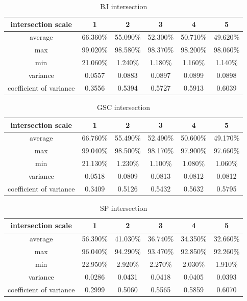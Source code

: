 \documentclass[runningheads,a4paper]{llncs}
\begin{document}
\begin{table}
\centering
\begin{tabular}{|c|c|c|c|c|c|}
\hline
 intersection scale & 1 & 2 & 3 & 4& 5 \\
\hline
average& 66.360\% & 55.090\% & 52.300\% & 50.710\%& 49.620\% \\
\hline
max& 99.020\% & 98.580\% & 98.370\% & 98.200\%& 98.060\% \\
\hline
min& 21.060\% & 1.240\% & 1.180\% & 1.160\%& 1.140\%\\
\hline
variance& 0.0557 & 0.0883 & 0.0897 & 0.0899& 0.0898 \\
\hline
coefficient of variance& 0.3556 & 0.5394 & 0.5727 & 0.5913& 0.6039\\
\hline
\end{tabular}
\caption{BJ intersection}
\label{ta:bj intersection}
\end{table} 

\begin{table}
\centering
\begin{tabular}{|c|c|c|c|c|c|}
\hline
intersection scale & 1 & 2 & 3 & 4& 5 \\
\hline
average& 66.760\% & 55.490\% & 52.490\% & 50.600\%& 49.170\% \\
\hline
max& 99.040\% & 98.500\% & 98.170\% & 97.900\%& 97.660\% \\
\hline
min& 21.130\% & 1.230\% & 1.100\% & 1.080\%& 1.060\%\\
\hline
variance& 0.0518 & 0.0809 & 0.0813 & 0.0812& 0.0812 \\
\hline
coefficient of variance& 0.3409 & 0.5126 & 0.5432 & 0.5632& 0.5795\\
\hline
\end{tabular}
\caption{GSC intersection}
\label{ta:gsc intersection}
\end{table} 


\begin{table}
\centering
\begin{tabular}{|c|c|c|c|c|c|}
\hline
intersection scale & 1 & 2 & 3 & 4& 5 \\
\hline
average& 56.390\% & 41.030\% & 36.740\% & 34.350\%& 32.660\% \\
\hline
max& 96.040\% & 94.290\% & 93.470\% & 92.850\%& 92.260\% \\
\hline
min& 22.950\% & 2.920\% & 2.270\% & 2.030\%& 1.910\%\\
\hline
variance& 0.0286 & 0.0431 & 0.0418& 0.0405&0.0393 \\
\hline
coefficient of variance& 0.2999 & 0.5060 & 0.5565 & 0.5859& 0.6070\\
\hline
\end{tabular}
\caption{SP intersection}
\label{ta:sp intersection}
\end{table} 
\end{document}
